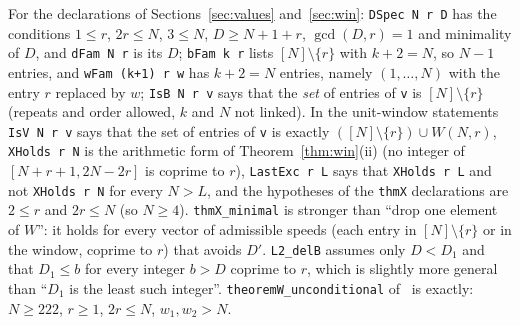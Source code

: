 \documentclass[11pt]{article}
\theoremstyle{definition}
\theoremstyle{remark}
\begin{document}
For the declarations of Sections~\ref{sec:values} and~\ref{sec:win}: \texttt{DSpec N r D} has the conditions $1\le r$, $2r\le N$, $3\le N$, $D\ge N+1+r$, $\gcd(D,r)=1$ and minimality of $D$, and \texttt{dFam N r} is its $D$; \texttt{bFam k r} lists $[N]\setminus\{r\}$ with $k+2=N$, so $N-1$ entries, and \texttt{wFam (k+1) r w} has $k+2=N$ entries, namely $(1,\dots,N)$ with the entry $r$ replaced by $w$; \texttt{IsB N r v} says that the \emph{set} of entries of \texttt{v} is $[N]\setminus\{r\}$ (repeats and order allowed, $k$ and $N$ not linked). In the unit-window statements \texttt{IsV N r v} says that the set of entries of \texttt{v} is exactly $([N]\setminus\{r\})\cup W(N,r)$, \texttt{XHolds r N} is the arithmetic form of Theorem~\ref{thm:win}(ii) (no integer of $[N+r+1,2N-2r]$ is coprime to $r$), \texttt{LastExc r L} says that \texttt{XHolds r L} and not \texttt{XHolds r N} for every $N>L$, and the hypotheses of the \texttt{thmX} declarations are $2\le r$ and $2r\le N$ (so $N\ge4$). \texttt{thmX\_minimal} is stronger than ``drop one element of $W$'': it holds for every vector of admissible speeds (each entry in $[N]\setminus\{r\}$ or in the window, coprime to $r$) that avoids $D'$. \texttt{L2\_delB} assumes only $D<D_1$ and that $D_1\le b$ for every integer $b>D$ coprime to $r$, which is slightly more general than ``$D_1$ is the least such integer''. \texttt{theoremW\_unconditional} of~\cite{B} is exactly: $N\ge222$, $r\ge1$, $2r\le N$, $w_1,w_2>N$.
\end{document}
